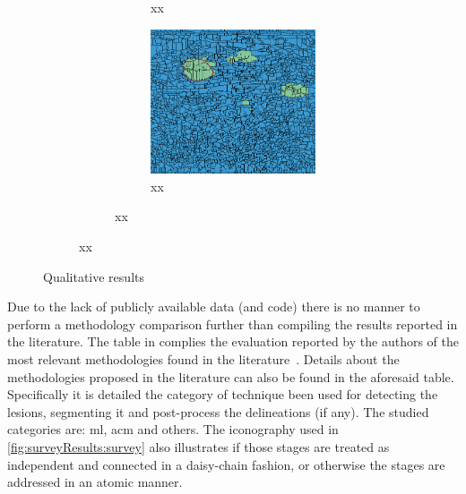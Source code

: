 \begin{figure}[h]
\begin{subfigure}[b]{0.45\textwidth}
\begin{subfigure}[b]{0.28\textwidth}
\begin{subfigure}[b]{\textwidth}
            \caption{xx}
            \label{fig:resuts:smallPWterm}
        \end{subfigure}
        \begin{subfigure}[b]{\textwidth}
            \includegraphics[width=\textwidth]{fpHom}
            \caption{{\small xx}}
            \label{fig:results:bigPWterm}
        \end{subfigure}
      \end{subfigure}
    \end{subfigure}
  \caption{Qualitative results}
  \label{fig:results}
\end{figure}

Due to the lack of publicly available data (and code) there is no manner to perform a methodology comparison further than compiling the results reported in the literature.
The table in  complies the evaluation reported by the authors of the most relevant methodologies found in the literature~\cite{massich2013phd}.
Details about the methodologies proposed in the literature can also be found in the aforesaid table.
Specifically it is detailed the category of technique been used for detecting the lesions, segmenting it and post-process the delineations (if any).
The studied categories are: \ac{ml}, \ac{acm} and others.
The iconography used in \cref{fig:surveyResults:survey} also illustrates if those stages are treated as independent and connected in a daisy-chain fashion, or otherwise the stages are addressed in an atomic manner.

